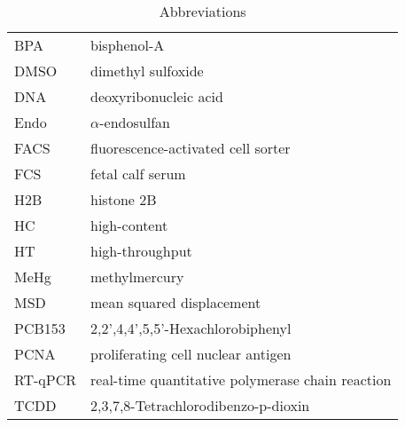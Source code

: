\documentclass[11pt, oneside]{Thesis} %
\begin{document}
\clearpage %
\begin{table}
\caption{Abbreviations}
\begin{tabular}{ll}
BPA & bisphenol-A \\
DMSO & dimethyl sulfoxide\\
DNA & deoxyribonucleic acid\\
Endo & $\alpha$-endosulfan \\
FACS & fluorescence-activated cell sorter\\
FCS & fetal calf serum\\
H2B & histone 2B\\
HC & high-content\\
HT & high-throughput\\
MeHg & methylmercury\\
MSD & mean squared displacement\\
PCB153 & 2,2',4,4',5,5'-Hexachlorobiphenyl\\
PCNA & proliferating cell nuclear antigen\\
RT-qPCR & real-time quantitative polymerase chain reaction\\
TCDD & 2,3,7,8-Tetrachlorodibenzo-p-dioxin\\
\end{tabular}
\end{table}
\clearpage %



\pagestyle{empty} %




\mainmatter %

\pagestyle{fancy} %
\end{document}
